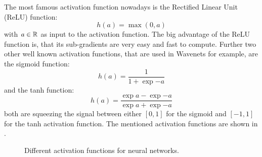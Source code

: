 The most famous activation function nowadays is the Rectified Linear Unit (ReLU) \cite{Zeiler2013} function:
\begin{equation}\label{eq:nn_theory_relu}
  h(a) = \max{(0, a)}
\end{equation}
with $a \in \mathbb{R}$ as input to the activation function.
The big advantage of the ReLU function is, that its sub-gradients are very easy and fast to compute.
Further two other well known activation functions, that are used in Wavenets for example, are the sigmoid function:
\begin{equation}\label{eq:nn_theory_sigmoid}
  h(a) = \frac{1}{1 + \exp{-a}}
\end{equation}
and the tanh function:
\begin{equation}\label{eq:nn_theory_tanh}
  h(a) = \frac{\exp{a} - \exp{-a}}{\exp{a} + \exp{-a}}
\end{equation}
both are squeezing the signal between either $[0, 1]$ for the sigmoid and $[-1, 1]$ for the tanh activation function.
The mentioned activation functions are shown in .
\begin{figure}[!ht]
  \centering
  \caption{Different activation functions for neural networks.}
  \label{fig:nn_theory_activation}
\end{figure}
\FloatBarrier
\noindent


